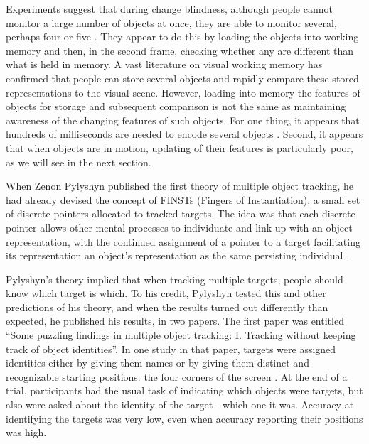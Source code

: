 \documentclass[
]{book}
\begin{document}
Experiments suggest that during change blindness, although people cannot monitor a large number of objects at once, they are able to monitor several, perhaps four or five \citep{rensinkVisualSearchChange2000}. They appear to do this by loading the objects into working memory and then, in the second frame, checking whether any are different than what is held in memory. A vast literature on visual working memory has confirmed that people can store several objects and rapidly compare these stored representations to the visual scene. However, loading into memory the features of objects for storage and subsequent comparison is not the same as maintaining awareness of the changing features of such objects. For one thing, it appears that hundreds of milliseconds are needed to encode several objects \citep{vogelTimeCourseConsolidation2006, ngiamVisualWorkingMemory2019}. Second, it appears that when objects are in motion, updating of their features is particularly poor, as we will see in the next section.

When Zenon Pylyshyn published the first theory of multiple object tracking, he had already devised the concept of FINSTs (Fingers of Instantiation), a small set of discrete pointers allocated to tracked targets. The idea was that each discrete pointer allows other mental processes to individuate and link up with an object representation, with the continued assignment of a pointer to a target facilitating its representation an object's representation as the same persisting individual \citep{pylyshynRoleLocationIndexes1989}.

Pylyshyn's theory implied that when tracking multiple targets, people should know which target is which. To his credit, Pylyshyn tested this and other predictions of his theory, and when the results turned out differently than expected, he published his results, in two papers. The first paper was entitled ``Some puzzling findings in multiple object tracking: I. Tracking without keeping track of object identities''. In one study in that paper, targets were assigned identities either by giving them names or by giving them distinct and recognizable starting positions: the four corners of the screen \citep{pylyshynPuzzlingFindingsMultiple2004}. At the end of a trial, participants had the usual task of indicating which objects were targets, but also were asked about the identity of the target - which one it was. Accuracy at identifying the targets was very low, even when accuracy reporting their positions was high.
\end{document}
